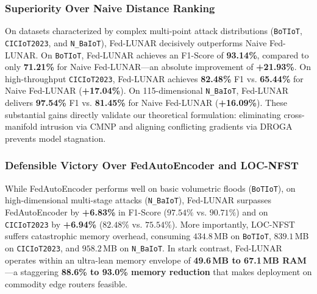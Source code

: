 \subsubsection{Superiority Over Naive Distance Ranking}
On datasets characterized by complex multi-point attack distributions (\texttt{BoTIoT}, \texttt{CICIoT2023}, and \texttt{N\_BaIoT}), Fed-LUNAR decisively outperforms Naive Fed-LUNAR. On \texttt{BoTIoT}, Fed-LUNAR achieves an F1-Score of \textbf{93.14\%}, compared to only \textbf{71.21\%} for Naive Fed-LUNAR---an absolute improvement of \textbf{+21.93\%}. On high-throughput \texttt{CICIoT2023}, Fed-LUNAR achieves \textbf{82.48\%} F1 vs. \textbf{65.44\%} for Naive Fed-LUNAR (\textbf{+17.04\%}). On 115-dimensional \texttt{N\_BaIoT}, Fed-LUNAR delivers \textbf{97.54\%} F1 vs. \textbf{81.45\%} for Naive Fed-LUNAR (\textbf{+16.09\%}). These substantial gains directly validate our theoretical formulation: eliminating cross-manifold intrusion via CMNP and aligning conflicting gradients via DROGA prevents model stagnation.

\subsubsection{Defensible Victory Over FedAutoEncoder and LOC-NFST}
While FedAutoEncoder performs well on basic volumetric floods (\texttt{BoTIoT}), on high-dimensional multi-stage attacks (\texttt{N\_BaIoT}), Fed-LUNAR surpasses FedAutoEncoder by \textbf{+6.83\%} in F1-Score ($97.54\%$ vs. $90.71\%$) and on \texttt{CICIoT2023} by \textbf{+6.94\%} ($82.48\%$ vs. $75.54\%$). More importantly, LOC-NFST suffers catastrophic memory overhead, consuming $434.8$\,MB on \texttt{BoTIoT}, $839.1$\,MB on \texttt{CICIoT2023}, and $958.2$\,MB on \texttt{N\_BaIoT}. In stark contrast, Fed-LUNAR operates within an ultra-lean memory envelope of \textbf{49.6\,MB to 67.1\,MB RAM}---a staggering \textbf{88.6\% to 93.0\% memory reduction} that makes deployment on commodity edge routers feasible.

